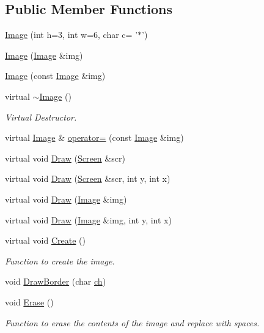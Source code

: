 \subsection*{Public Member Functions}
\begin{DoxyCompactItemize}
\item 
\hyperlink{classImage_a13aa6167bbc77b7a311a181d67caa058}{Image} (int h=3, int w=6, char c= '$\ast$')
\item 
\hyperlink{classImage_ad9a2ebd07a4f458ba24d91af0122418e}{Image} (\hyperlink{classImage}{Image} \&img)
\item 
\hyperlink{classImage_aa44ed77d00d96d2c878b050835f828c4}{Image} (const \hyperlink{classImage}{Image} \&img)
\item 
virtual \hyperlink{classImage_a0294f63700543e11c0f0da85601c7ae5}{$\sim$\-Image} ()
\begin{DoxyCompactList}\small\item\em Virtual Destructor. \end{DoxyCompactList}\item 
virtual \hyperlink{classImage}{Image} \& \hyperlink{classImage_a645773587ffefda3891bfc7f6cc541bb}{operator=} (const \hyperlink{classImage}{Image} \&img)
\item 
virtual void \hyperlink{classImage_a057cb6b10590608656ff2a7aa159f515}{Draw} (\hyperlink{classScreen}{Screen} \&scr)
\item 
virtual void \hyperlink{classImage_a1e3d4ae638b3fc1fbee81c509c1551f6}{Draw} (\hyperlink{classScreen}{Screen} \&scr, int y, int x)
\item 
virtual void \hyperlink{classImage_ad20f87dc888d01cadc829f18d23066dc}{Draw} (\hyperlink{classImage}{Image} \&img)
\item 
virtual void \hyperlink{classImage_a2e863a5b8287ca3adb08fdaae513f437}{Draw} (\hyperlink{classImage}{Image} \&img, int y, int x)
\item 
virtual void \hyperlink{classImage_a6bb7dff9e4c4c31b2d63d7b0a330ef89}{Create} ()
\begin{DoxyCompactList}\small\item\em Function to create the image. \end{DoxyCompactList}\item 
void \hyperlink{classImage_a16f8719e59b1180aa7e0e2fdf3e4d421}{Draw\-Border} (char \hyperlink{classImage_a2d2bff881014df332b1086483d0eb0e9}{ch})
\item 
void \hyperlink{classImage_a118986dafc30b76c4aa5e7453236a8b2}{Erase} ()
\begin{DoxyCompactList}\small\item\em Function to erase the contents of the image and replace with spaces. \end{DoxyCompactList}\item 

\end{DoxyCompactItemize}
